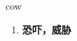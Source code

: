 
\begin{frame}
{\huge cow}
\begin{center}
\begin{enumerate}\Large
  \item \textbf{恐吓，威胁}
\end{enumerate}
\end{center}
\end{frame}
